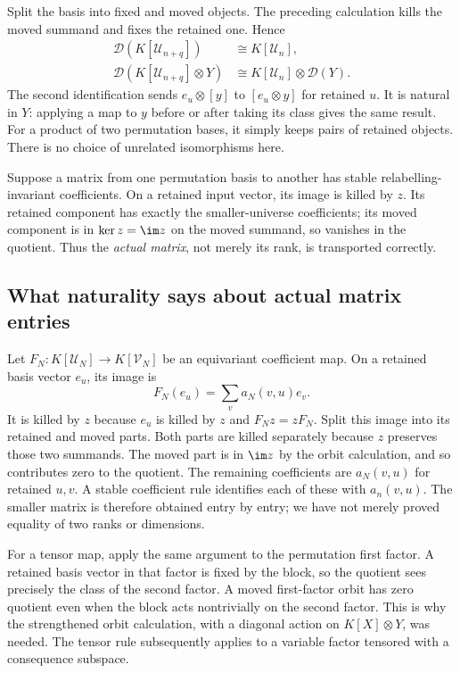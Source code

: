 \documentclass[11pt,a4paper,oneside,openany]{book}
\theoremstyle{definition}\newtheorem{definition}[theorem]{Definition}
\theoremstyle{remark}\newtheorem{remark}[theorem]{Remark}
\newcommand{\D}{\mathcal D}\newcommand{\Del}{\mathcal D}\newcommand{\Lift}{\mathsf L}
\numberwithin{equation}{chapter}
\begin{document}
Split the basis into fixed and moved objects. The preceding calculation kills the moved summand and fixes the retained one. Hence
\begin{align}
\D(K[\mathcal U_{n+q}])&\cong K[\mathcal U_n],\label{tx:eq:basis}\\
\D(K[\mathcal U_{n+q}]\otimes Y)&\cong K[\mathcal U_n]\otimes\D(Y).\label{tx:eq:tensor}
\end{align}
The second identification sends $e_u\otimes[y]$ to $[e_u\otimes y]$ for retained $u$. It is natural in $Y$: applying a map to $y$ before or after taking its class gives the same result. For a product of two permutation bases, it simply keeps pairs of retained objects. There is no choice of unrelated isomorphisms here.

Suppose a matrix from one permutation basis to another has stable relabelling-invariant coefficients. On a retained input vector, its image is killed by $z$. Its retained component has exactly the smaller-universe coefficients; its moved component is in $\ker z=\im z$ on the moved summand, so vanishes in the quotient. Thus the \emph{actual matrix}, not merely its rank, is transported correctly.

\subsection{What naturality says about actual matrix entries}
Let $F_N:K[\mathcal U_N]\to K[\mathcal V_N]$ be an equivariant
coefficient map. On a retained basis vector $e_u$, its image is
\[
                       F_N(e_u)=\sum_v a_N(v,u)e_v.
\]
It is killed by $z$ because $e_u$ is killed by $z$ and $F_Nz=zF_N$.
Split this image into its retained and moved parts. Both parts are
killed separately because $z$ preserves those two summands. The moved
part is in $\im z$ by the orbit calculation, and so contributes zero
to the quotient. The remaining coefficients are $a_N(v,u)$ for
retained $u,v$. A stable coefficient rule identifies each of these
with $a_n(v,u)$. The smaller matrix is therefore obtained entry by
entry; we have not merely proved equality of two ranks or dimensions.

For a tensor map, apply the same argument to the permutation first
factor. A retained basis vector in that factor is fixed by the block,
so the quotient sees precisely the class of the second factor. A moved
first-factor orbit has zero quotient even when the block acts
nontrivially on the second factor. This is why the strengthened orbit
calculation, with a diagonal action on $K[X]\otimes Y$, was needed.
The tensor rule subsequently applies to a variable factor tensored
with a consequence subspace.
\end{document}
